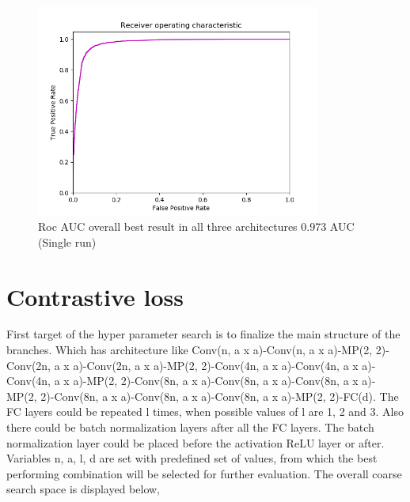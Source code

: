 \begin{figure}[ht]
\centering
\includegraphics[height= 7cm]{images/densenet/densenet_two_channel_ninetysevenAUC}
\caption{Roc AUC overall best result in all three architectures 0.973 AUC (Single run)}
\label{fig:densenet_two_channel_ninetysevenAUC}
\end{figure}

\flushbottom
\newpage

\section{Contrastive loss}
\label{sec:contrastive_loss_results}
First target of the hyper parameter search is to finalize the main structure of the branches. Which has architecture like Conv(n, a x a)-Conv(n, a x a)-MP(2, 2)-Conv(2n, a x a)-Conv(2n, a x a)-MP(2, 2)-Conv(4n, a x a)-Conv(4n, a x a)-
Conv(4n, a x a)-MP(2, 2)-Conv(8n, a x a)-Conv(8n, a x a)-Conv(8n, a x a)-MP(2, 2)-Conv(8n, a x a)-Conv(8n, a x a)-Conv(8n, a x a)-MP(2, 2)-FC(d). The FC layers could be repeated l times, when possible values of l are 1, 2 and 3. Also 
there could be batch normalization layers after all the FC layers. The batch normalization layer could be placed before the activation ReLU layer or after. Variables n, a, l, d are set with predefined set of values, 
from which the best performing combination will be selected for further evaluation. The overall coarse search space is displayed below,


